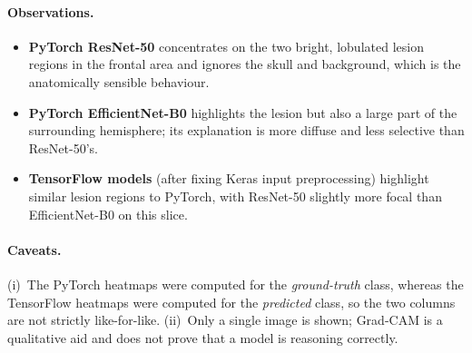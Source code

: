 \documentclass[11pt,a4paper]{article}
\begin{document}
\paragraph{Observations.}
\begin{itemize}
  \item \textbf{PyTorch ResNet-50} concentrates on the two bright, lobulated lesion regions in the frontal area and ignores the skull and background, which is the anatomically sensible behaviour.
  \item \textbf{PyTorch EfficientNet-B0} highlights the lesion but also a large part of the surrounding hemisphere; its explanation is more diffuse and less selective than ResNet-50's.
  \item \textbf{TensorFlow models} (after fixing Keras input preprocessing) highlight similar lesion regions to PyTorch, with ResNet-50 slightly more focal than EfficientNet-B0 on this slice.
\end{itemize}

\paragraph{Caveats.} (i)~The PyTorch heatmaps were computed for the \emph{ground-truth} class, whereas the TensorFlow heatmaps were computed for the \emph{predicted} class, so the two columns are not strictly like-for-like. (ii)~Only a single image is shown; Grad-CAM is a qualitative aid and does not prove that a model is reasoning correctly.

\end{document}

